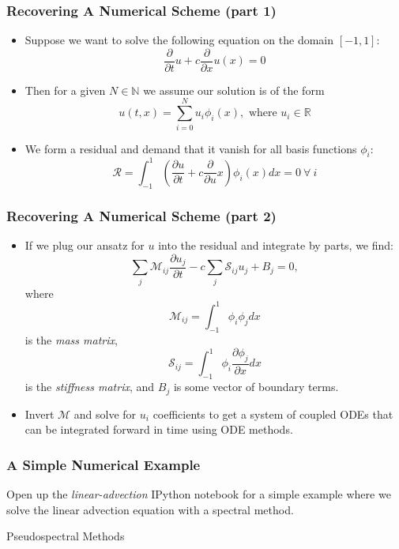 \documentclass[]{beamer}
\newcommand{\R}{\mathbb{R}}
\newcommand{\N}{\mathbb{N}}
\newcommand{\pd}[2]{\frac{\partial #1}{\partial #2}}
\newcommand{\pdd}[1]{\frac{\partial}{\partial #1}}
\begin{document}
\begin{frame}
  \frametitle{Recovering A Numerical Scheme (part 1)}
  \begin{itemize}
    \item Suppose we want to solve the following equation on the domain $[-1,1]$:
      $$\pdd{t}u+c\pdd{x} u(x) = 0$$
      \pause
    \item Then for a given $N\in\N$ we assume our solution is of the form
      $$u(t,x)=\sum_{i=0}^N u_i \phi_i(x),\text{ where }u_i \in\R$$
      \pause
    \item We form a residual and demand that it vanish for all basis functions $\phi_i$:
      $$\mathcal{R} = \int_{-1}^1 \left(\pd{u}{t} + c\pdd{u}{x}\right)\phi_i(x)dx=0\ \forall\ i$$
  \end{itemize}
\end{frame}

\begin{frame}
  \frametitle{Recovering A Numerical Scheme (part 2)}
  \begin{itemize}
  \item If we plug our ansatz for $u$ into the residual and integrate by parts, we find:
    $$\sum_{j}\mathcal{M}_{ij}\pd{u_j}{t} - c \sum_{j}\mathcal{S}_{ij}u_j + B_j =0,$$
    where
    $$\mathcal{M}_{ij} = \int_{-1}^1\phi_i\phi_j dx$$
    is the \textit{mass matrix},
    $$\mathcal{S}_{ij} = \int_{-1}^1\phi_i\pd{\phi_j}{x}dx$$
    is the \textit{stiffness matrix}, and $B_j$ is some vector of
    boundary terms.
    \pause
  \item Invert $\mathcal{M}$ and solve for $u_i$ coefficients to get a
    system of coupled ODEs that can be integrated forward in time
    using ODE methods.
  \end{itemize}
\end{frame}

\begin{frame}
  \frametitle{A Simple Numerical Example}
  \begin{center}
    \begin{huge}
      Open up the \textit{linear-advection} IPython notebook for a
      simple example where we solve the linear advection equation with a
      spectral method.
    \end{huge}
  \end{center}
\end{frame}

\begin{frame}[plain]
  \begin{center}
    {\huge Pseudospectral Methods}
  \end{center}
\end{frame}
\end{document}
